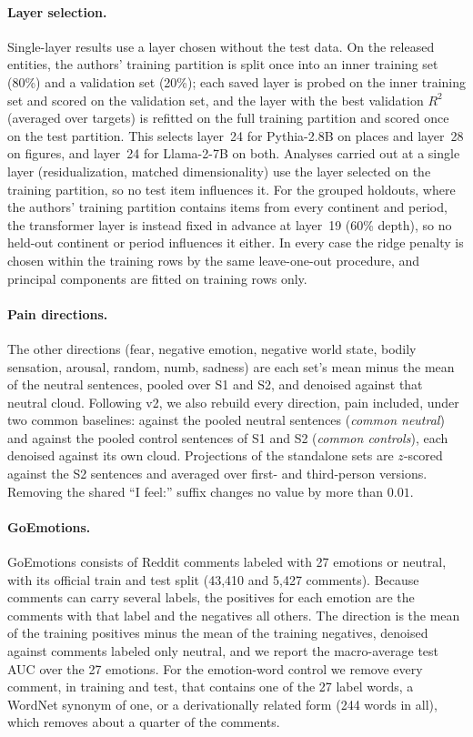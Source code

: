 \documentclass[11pt]{article}
\begin{document}
\paragraph{Layer selection.} Single-layer results use a layer chosen without the test
data. On the released entities, the authors' training partition is split once into an
inner training set (80\%) and a validation set (20\%); each saved layer is probed on the
inner training set and scored on the validation set, and the layer with the best validation
$R^2$ (averaged over targets) is refitted on the full training partition and scored once on
the test partition. This selects layer~24 for Pythia-2.8B on places and layer~28 on
figures, and layer~24 for Llama-2-7B on both. Analyses carried out at a single layer (residualization, matched dimensionality) use the layer selected on the training partition, so no test item influences it. For the grouped holdouts, where the authors' training partition
contains items from every continent and period, the transformer layer is instead fixed in
advance at layer~19 (60\% depth), so no held-out continent or period influences it either. In every case the ridge
penalty is chosen within the training rows by the same leave-one-out procedure, and principal
components are fitted on training rows only. 

\paragraph{Pain directions.} The other
directions (fear, negative emotion, negative world state, bodily sensation, arousal, random,
numb, sadness) are each set's mean minus the mean of the neutral sentences, pooled over S1
and S2, and denoised against that neutral cloud. Following v2, we also rebuild every direction,
pain included, under two common baselines: against the pooled neutral sentences
(\emph{common neutral}) and against the pooled control sentences of S1 and S2
(\emph{common controls}), each denoised against its own cloud. Projections of the standalone
sets are $z$-scored against the S2 sentences and averaged over first- and third-person
versions. Removing the shared ``I feel:'' suffix changes no
value by more than $0.01$.

\paragraph{GoEmotions.} GoEmotions \citep{demszky2020goemotions} consists of Reddit comments labeled with 27 emotions or neutral, with its official train and test split (43{,}410 and
5{,}427 comments). Because comments can carry several labels, the positives for each emotion
are the comments with that label and the negatives all others. The direction is the mean of
the training positives minus the mean of the training negatives, denoised against comments
labeled only neutral, and we report the macro-average test AUC over the 27 emotions. For the
emotion-word control we remove every comment, in training and test, that contains one of the
27 label words, a WordNet synonym of one, or a derivationally related form (244 words in
all), which removes about a quarter of the comments.
\end{document}
